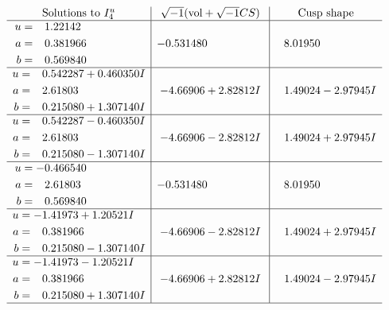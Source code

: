 \documentclass[1p]{elsarticle_modified}
\theoremstyle{definition}
\newcommand{\I}{\sqrt{-1}}
\begin{document}
$$\begin{array}{c|c|c}  
\text{Solutions to }I^u_{4}& \I (\text{vol} + \sqrt{-1}CS) & \text{Cusp shape}\\
 \hline 
\begin{aligned}
u &= \phantom{-}1.22142\phantom{ +0.000000I} \\
a &= \phantom{-}0.381966\phantom{ +0.000000I} \\
b &= \phantom{-}0.569840\phantom{ +0.000000I}\end{aligned}
 & -0.531480\phantom{ +0.000000I} & \phantom{-}8.01950\phantom{ +0.000000I} \\ \hline\begin{aligned}
u &= \phantom{-}0.542287 + 0.460350 I \\
a &= \phantom{-}2.61803\phantom{ +0.000000I} \\
b &= \phantom{-}0.215080 + 1.307140 I\end{aligned}
 & -4.66906 + 2.82812 I & \phantom{-}1.49024 - 2.97945 I \\ \hline\begin{aligned}
u &= \phantom{-}0.542287 - 0.460350 I \\
a &= \phantom{-}2.61803\phantom{ +0.000000I} \\
b &= \phantom{-}0.215080 - 1.307140 I\end{aligned}
 & -4.66906 - 2.82812 I & \phantom{-}1.49024 + 2.97945 I \\ \hline\begin{aligned}
u &= -0.466540\phantom{ +0.000000I} \\
a &= \phantom{-}2.61803\phantom{ +0.000000I} \\
b &= \phantom{-}0.569840\phantom{ +0.000000I}\end{aligned}
 & -0.531480\phantom{ +0.000000I} & \phantom{-}8.01950\phantom{ +0.000000I} \\ \hline\begin{aligned}
u &= -1.41973 + 1.20521 I \\
a &= \phantom{-}0.381966\phantom{ +0.000000I} \\
b &= \phantom{-}0.215080 - 1.307140 I\end{aligned}
 & -4.66906 - 2.82812 I & \phantom{-}1.49024 + 2.97945 I \\ \hline\begin{aligned}
u &= -1.41973 - 1.20521 I \\
a &= \phantom{-}0.381966\phantom{ +0.000000I} \\
b &= \phantom{-}0.215080 + 1.307140 I\end{aligned}
 & -4.66906 + 2.82812 I & \phantom{-}1.49024 - 2.97945 I\\
 \hline 
 \end{array}$$\newpage\newpage\renewcommand{\arraystretch}{1}
\end{document}
